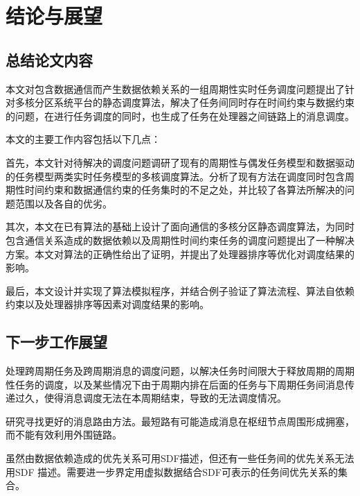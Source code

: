 
\chapter*{结论与展望}

\section*{总结论文内容}
本文对包含数据通信而产生数据依赖关系的一组周期性实时任务调度问题提出了针对多核分区系统平台的静态调度算法，解决了任务间同时存在时间约束与数据约束的问题，在进行任务调度的同时，也生成了任务在处理器之间链路上的消息调度。

本文的主要工作内容包括以下几点：

首先，本文针对待解决的调度问题调研了现有的周期性与偶发任务模型和数据驱动的任务模型两类实时任务模型的多核调度算法。分析了现有方法在调度同时包含周期性时间约束和数据通信约束的任务集时的不足之处，并比较了各算法所解决的问题范围以及各自的优劣。

其次，本文在已有算法的基础上设计了面向通信的多核分区静态调度算法，为同时包含通信关系造成的数据依赖以及周期性时间约束任务的调度问题提出了一种解决方案。本文对算法的正确性给出了证明，并提出了处理器排序等优化对调度结果的影响。

最后，本文设计并实现了算法模拟程序，并结合例子验证了算法流程、算法自依赖约束以及处理器排序等因素对调度结果的影响。

\section*{下一步工作展望}

处理跨周期任务及跨周期消息的调度问题，以解决任务时间限大于释放周期的周期性任务的调度，以及某些情况下由于周期内排在后面的任务与下周期任务间消息传递过久，使得消息调度无法在本周期结束，导致的无法调度情况。

研究寻找更好的消息路由方法。最短路有可能造成消息在枢纽节点周围形成拥塞，而不能有效利用外围链路。

虽然由数据依赖造成的优先关系可用SDF描述，但还有一些任务间的优先关系无法用SDF 描述。需要进一步界定用虚拟数据结合SDF可表示的任务间优先关系的集合。
